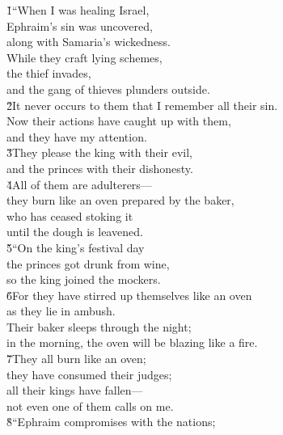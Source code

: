 \begin{poetry}
\poeml {}
\v{1}``When I was healing Israel, \\
\poeml Ephraim's sin was uncovered, \\
\poemlll       along with Samaria's wickedness. \\
\poeml While they craft lying schemes, \\
\poemll    the thief invades, \\
\poemlll       and the gang of thieves plunders outside. \\
\poeml \v{2}It never occurs to them that I remember all their sin. \\
\poemll    Now their actions have caught up with them, \\
\poemlll       and they have my attention. \\
\poeml \v{3}They please the king with their evil, \\
\poemll    and the princes with their dishonesty. \\
\poeml \v{4}All of them are adulterers--- \\
\poemll    they burn like an oven prepared by the baker, \\
\poeml who has ceased stoking it \\
\poemll    until the dough is leavened. \\
\poeml \v{5}``On the king's festival day \\
\poemll    the princes got drunk from wine, \\
\poemlll       so the king joined the mockers. \\
\poeml \v{6}For they have stirred up themselves like an oven \\
\poemll    as they lie in ambush. \\
\poeml Their baker sleeps through the night; \\
\poemll    in the morning, the oven will be blazing like a fire. \\
\poeml \v{7}They all burn like an oven; \\
\poemll    they have consumed their judges; \\
\poeml all their kings have fallen--- \\
\poemll    not even one of them calls on me. \\
\poeml \v{8}``Ephraim compromises with the nations; \\

\end{poetry}

